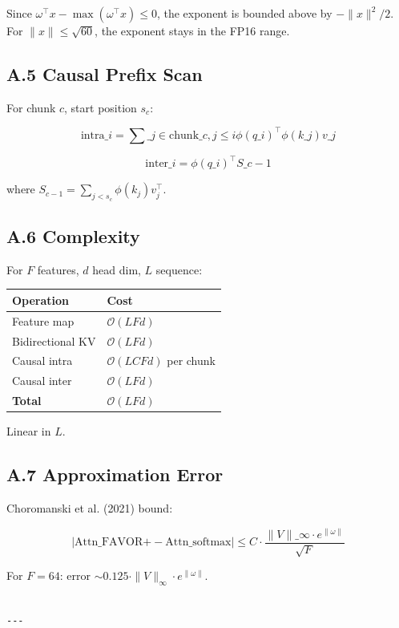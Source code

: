 Since $\omega^\top x - \max(\omega^\top x) \leq 0$, the exponent is bounded 
above by $-\|x\|^2/2$. For $\|x\| \leq \sqrt{60}$, the exponent stays in 
the FP16 range.

\subsection{A.5 Causal Prefix Scan}

For chunk $c$, start position $s_c$:

\[
\text{intra}\_i = \sum\_{j \in \text{chunk}\_c, j \leq i} \phi(q\_i)^\top \phi(k\_j) v\_j
\tag{A.6}
\]

\[
\text{inter}\_i = \phi(q\_i)^\top S\_{c-1}
\tag{A.7}
\]

where $S_{c-1} = \sum_{j < s_c} \phi(k_j) v_j^\top$.

\subsection{A.6 Complexity}

For $F$ features, $d$ head dim, $L$ sequence:

\begin{table}[H]
\centering
\small
\begin{tabular}{ll}
\toprule
\textbf{Operation} & \textbf{Cost} \\
\midrule
Feature map & $\mathcal{O}(L F d)$ \\
Bidirectional KV & $\mathcal{O}(L F d)$ \\
Causal intra & $\mathcal{O}(L C F d)$ per chunk \\
Causal inter & $\mathcal{O}(L F d)$ \\
\textbf{Total} & $\mathcal{O}(L F d)$ \\
\bottomrule
\end{tabular}
\end{table}

Linear in $L$.

\subsection{A.7 Approximation Error}

Choromanski et al. (2021) bound:

\[
\left|\text{Attn}\_{\text{FAVOR+}} - \text{Attn}\_{\text{softmax}}\right| \leq C \cdot \frac{\|V\|\_\infty \cdot e^{\|\omega\|}}{\sqrt{F}}
\tag{A.8}
\]

For $F = 64$: error $\sim 0.125 \cdot \|V\|_\infty \cdot e^{\|\omega\|}$.
\begin{lstlisting}

---
\end{lstlisting}